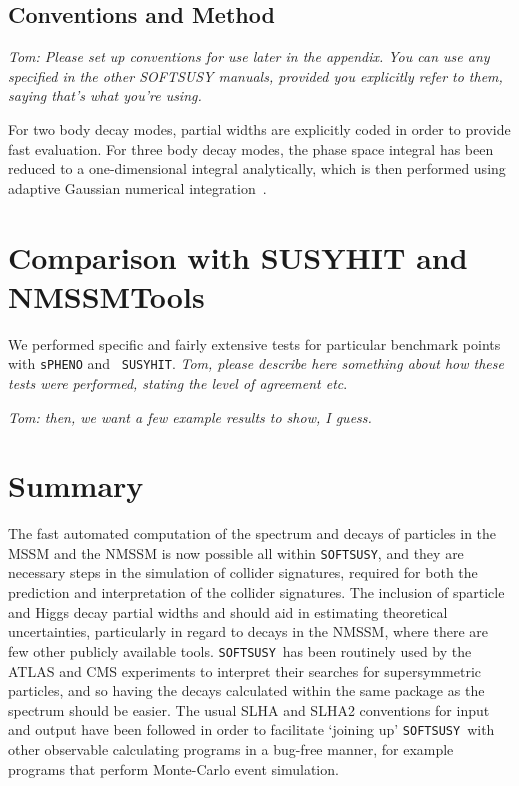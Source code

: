 \documentclass[final,3p,times,pdflatex]{elsarticle}
\def\code#1{{\tt #1}}
\begin{document}
\subsection{Conventions and Method \label{sec:conv}}
{\em Tom: Please set up conventions for use later in the appendix. You can use
any specified in the other SOFTSUSY manuals, provided you explicitly refer to
them, saying that's what you're using.}

For two body decay modes, partial widths are explicitly coded in order to
provide fast evaluation. For three body decay modes, the phase space integral
has been reduced to a one-dimensional integral analytically, which is then
performed using adaptive Gaussian numerical integration~\cite{numRec}.



\section{Comparison with SUSYHIT and NMSSMTools \label{sec:comp}}

We performed specific and fairly extensive tests for particular benchmark
points with \code{sPHENO} and ~\code{SUSYHIT}. {\em Tom, please describe here
  something about how these tests were performed, stating the level of
  agreement etc}.

{\em Tom: then, we want a few example results to show, I guess.}

\section{Summary \label{sec:sum}}
The fast automated computation of the spectrum and decays of particles in the
MSSM and the NMSSM is now possible all within \code{SOFTSUSY}, and they are
necessary steps in the simulation of collider signatures, required for both
the prediction and interpretation of the collider signatures. The inclusion
of sparticle and Higgs decay partial widths and should aid in estimating 
theoretical uncertainties, particularly in regard to decays in the NMSSM,
where there are few other publicly available tools. 
\code{SOFTSUSY}~has been routinely used by the ATLAS and CMS experiments to
interpret their searches for supersymmetric particles, and so having the
decays calculated within the same package as the spectrum should be easier. 
The usual SLHA and SLHA2
conventions for input and output have been followed in order to facilitate
`joining up' \code{SOFTSUSY}~with other observable calculating programs in a
bug-free manner, for example programs that perform Monte-Carlo event
simulation. 
\end{document}
